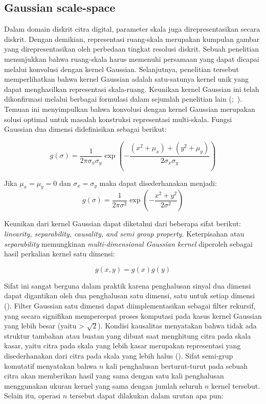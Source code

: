 \subsection{Gaussian scale-space}

Dalam domain diskrit citra digital, parameter skala juga direpresentasikan secara diskrit. 
Dengan demikian, representasi ruang-skala merupakan kumpulan gambar yang direpresentasikan oleh perbedaan tingkat resolusi diskrit. 
Sebuah penelitian menunjukkan bahwa ruang-skala harus memenuhi persamaan yang dapat dicapai melalui konvolusi dengan kernel Gaussian. 
Selanjutnya, penelitian tersebut memperlihatkan bahwa kernel Gaussian adalah satu-satunya kernel unik yang dapat menghasilkan representasi skala-ruang. 
Keunikan kernel Gaussian ini telah dikonfirmasi melalui berbagai formulasi dalam sejumlah penelitian lain (\cite[hlm. 92--93]{Lowe2004};~\cite[hlm. 13--15]{mikolajczyk:tel-00584096}). 
Temuan ini menyimpulkan bahwa konvolusi dengan kernel Gaussian merupakan solusi optimal untuk masalah konstruksi representasi multi-skala. Fungsi Gaussian dua dimensi didefinisikan sebagai berikut:

\begin{equation*}
g(\sigma) = \frac{1}{2\pi\sigma_{x}\sigma_{y}}\exp\left(-\frac{(x^2+\mu_{x})+(y^2+\mu_{y})}{2\sigma_{x}\sigma_{y}}\right)
\end{equation*}

Jika \(\mu_{x} = \mu_{y} = 0\) dan \(\sigma_{x} = \sigma_{y}\) maka dapat disederhanakan menjadi:
\begin{equation}
g(\sigma) = \frac{1}{2\pi\sigma^2}\exp\left(-\frac{x^2+y^2}{2\sigma^2}\right)
\label{eq:gaussian kernel}
\end{equation}

Keunikan dari kernel Gaussian dapat diketahui dari beberapa sifat berikut: 
\emph{linearity, separability, causality, and semi group property.} Keterpisahan 
atau \emph{separability} memungkinan \emph{multi-dimensional Gaussian kernel} diperoleh sebagai hasil perkalian kernel satu dimensi:

\begin{equation*}
  g(x,y) = g(x)g(y)
\end{equation*}

Sifat ini sangat berguna dalam praktik karena penghalusan sinyal dua dimensi dapat digantikan oleh dua penghalusan satu dimensi, satu untuk setiap dimensi (\cite[hlm. 92]{Lowe2004}). 
Filter Gaussian satu dimensi dapat diimplementasikan sebagai filter rekursif, yang secara signifikan mempercepat proses 
komputasi pada kasus kernel Gaussian yang lebih besar (yaitu > \( \sqrt{2}\)). 
Kondisi kausalitas menyatakan bahwa tidak ada struktur tambahan atau buatan yang dibuat saat menghitung citra pada skala kasar, 
yaitu citra pada skala yang lebih kasar merupakan representasi yang disederhanakan dari citra pada skala yang lebih halus (\cite[hlm. 13--14]{mikolajczyk:tel-00584096}). 
Sifat semi-grup komutatif menyatakan bahwa \(n\) kali penghalusan berturut-turut pada sebuah citra akan memberikan hasil yang sama dengan satu kali penghalusan menggunakan ukuran kernel yang sama dengan jumlah seluruh \(n\) kernel tersebut. 
Selain itu, operasi \(n\) tersebut dapat dilakukan dalam urutan apa pun:

